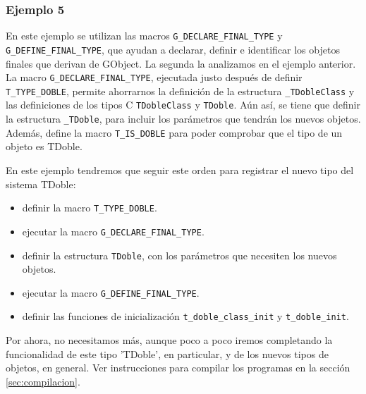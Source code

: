 \subsubsection{Ejemplo 5}
En este ejemplo se utilizan las macros \texttt{G\_DECLARE\_FINAL\_TYPE} y
\texttt{G\_DEFINE\_FINAL\_TYPE}, que ayudan a declarar, definir e identificar los objetos finales que
derivan de \textsf{GObject}. La segunda la analizamos en el ejemplo anterior.
La macro \texttt{G\_DECLARE\_FINAL\_TYPE}, ejecutada justo después de definir \texttt{T\_TYPE\_DOBLE},
permite ahorrarnos la definición de la estructura \texttt{\_TDobleClass} y las definiciones de los
tipos C \texttt{TDobleClass} y \texttt{TDoble}. Aún así, se tiene que definir la estructura \texttt{\_TDoble},
para incluir los parámetros que tendrán los nuevos objetos. Además, define la macro \texttt{T\_IS\_DOBLE}
para poder comprobar que el tipo de un objeto es \textsf{TDoble}.

En este ejemplo tendremos  que seguir este orden para registrar el nuevo tipo del sistema \textsf{TDoble}:
\begin{itemize}
  \tightlist
\item definir la macro \texttt{T\_TYPE\_DOBLE}.
\item ejecutar la macro \texttt{G\_DECLARE\_FINAL\_TYPE}.
\item definir la estructura \texttt{TDoble}, con los parámetros que necesiten los nuevos objetos.
\item ejecutar la macro \texttt{G\_DEFINE\_FINAL\_TYPE}.
\item definir las funciones de inicialización \texttt{t\_doble\_class\_init} y \texttt{t\_doble\_init}.
\end{itemize}
Por ahora, no necesitamos más, aunque poco a poco iremos completando la funcionalidad
de este tipo 'TDoble', en particular, y de los nuevos tipos de objetos, en general.
Ver instrucciones para compilar los programas en la sección \ref{sec:compilacion}.

